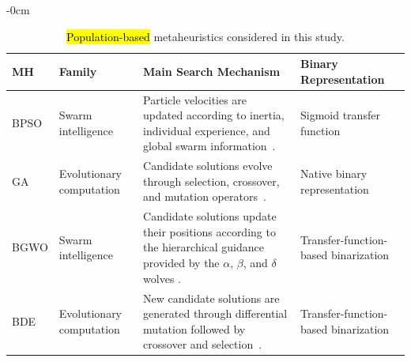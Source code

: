 \documentclass[mathematics,article,accept,moreauthors]{Definitions/mdpi}
\begin{document}
\begin{table}[H]
\caption{\hl{Population-based} %
 metaheuristics considered in this study.}
\label{tab:mhs}


\begin{adjustwidth}{-\extralength}{0cm}
\begin{minipage}{\fulllength}



\begin{tabularx}{\textwidth}{@{}p{1.6cm} p{2.2cm} p{8.7cm} p{4.5cm}@{}}
\toprule
\textbf{MH} & \textbf{Family} & \textbf{Main Search Mechanism} &
\textbf{Binary Representation} \\
\midrule

BPSO &
Swarm intelligence &
Particle velocities are updated according to inertia, individual experience,
and global swarm information~\cite{kennedy1997discrete}. &
Sigmoid transfer function \\

\midrule

GA &
Evolutionary computation &
Candidate solutions evolve through selection, crossover, and mutation
operators~\cite{holland1975adaptation,goldberg1989genetic}. &
Native binary representation \\

\midrule

BGWO &
Swarm intelligence &
Candidate solutions update their positions according to the hierarchical
guidance provided by the $\alpha$, $\beta$, and $\delta$ wolves
\cite{mirjalili2014grey,emary2016binary}. &
Transfer-function-based binarization \\

\midrule

BDE &
Evolutionary computation &
New candidate solutions are generated through differential mutation followed
by crossover and selection~\cite{storn1997differential,pampara2006binary}. &
Transfer-function-based binarization \\

\bottomrule


\end{tabularx}

\end{minipage}
\end{adjustwidth}


\end{table}
\end{document}

